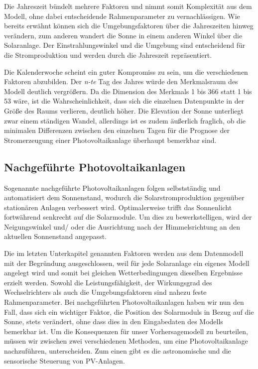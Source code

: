 \documentclass[12pt, a4paper]{article}
\begin{document}
Die Jahreszeit bündelt mehrere Faktoren und nimmt somit Komplexität aus dem Modell, ohne dabei entscheidende Rahmenparameter zu vernachlässigen. Wie bereits erwähnt können sich die Umgebungsfaktoren über die Jahreszeiten hinweg verändern, zum anderen wandert die Sonne in einem anderen Winkel über die Solaranlage. Der Einstrahlungswinkel und die Umgebung sind entscheidend für die Stromproduktion und werden durch die Jahreszeit repräsentiert.

 Die Kalenderwoche scheint ein guter Kompromiss zu sein, um die verschiedenen Faktoren abzubilden. Der \textit{n-te} Tag des Jahres würde den Merkmalsraum des Modell deutlich vergrößern. Da die Dimension des Merkmals 1 bis 366 statt 1 bis 53 wäre, ist die Wahrscheinlichkeit, dass sich die einzelnen Datenpunkte in der Größe des Raums verlieren, deutlich höher. Die Elevation der Sonne unterliegt zwar einem ständigen Wandel, allerdings ist es zudem äußerlich fraglich, ob die minimalen Differenzen zwischen den einzelnen Tagen für die Prognose der Stromerzeugung einer Photovoltaikanlage überhaupt bemerkbar sind.

 

\subsection{Nachgeführte Photovoltaikanlagen}

Sogenannte nachgeführte Photovoltaikanlagen folgen selbstständig und automatisiert dem Sonnenstand, wodurch die Solarstromproduktion gegenüber stationären Anlagen verbessert wird. Optimalerweise trifft das Sonnenlicht fortwährend senkrecht auf die Solarmodule. Um dies zu bewerkstelligen, wird der Neigungswinkel und/ oder die Ausrichtung nach der Himmelsrichtung an den aktuellen Sonnenstand angepasst. 

Die im letzten Unterkapitel genannten Faktoren werden aus dem Datenmodell mit der Begründung ausgeschlossen, weil für jede Solaranlage ein eigenes Modell angelegt wird und somit bei gleichen Wetterbedingungen dieselben Ergebnisse erzielt werden. 
Sowohl die Leistungsfähigkeit, der Wirkungsgrad des Wechselrichters als auch die Umgebungsfaktoren sind nahezu feste Rahmenparameter. Bei nachgeführten Photovoltaikanlagen haben wir nun den Fall, dass sich ein wichtiger Faktor, die Position des Solarmoduls in Bezug auf die Sonne, stets verändert, ohne dass dies in den Eingabedaten des Modells bemerkbar ist. Um die Konsequenzen für unser Vorhersagemodell zu beurteilen, müssen wir zwischen zwei verschiedenen Methoden, um eine Photovoltaikanlage nachzuführen, unterscheiden. Zum einen gibt es die astronomische und die sensorische Steuerung von PV-Anlagen. 
\end{document}

